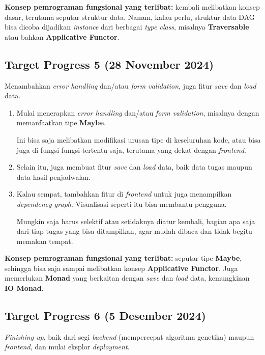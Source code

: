 \documentclass{article}
\begin{document}
\textbf{Konsep pemrograman fungsional yang terlibat:} kembali melibatkan konsep dasar, terutama seputar struktur data. Namun, kalau perlu, struktur data DAG bisa dicoba dijadikan \textit{instance} dari berbagai \textit{type class}, misalnya \textbf{Traversable} atau bahkan \textbf{Applicative Functor}.

\subsection*{Target Progress 5 (28 November 2024)}

Menambahkan \textit{error handling} dan/atau \textit{form validation}, juga fitur \textit{save} dan \textit{load} data.

\begin{enumerate}
    \item Mulai menerapkan \textit{error handling} dan/atau \textit{form validation}, misalnya dengan memanfaatkan tipe \textbf{Maybe}.
    
    Ini bisa saja melibatkan modifikasi urusan tipe di keseluruhan kode, atau bisa juga di fungsi-fungsi tertentu saja, terutama yang dekat dengan \textit{frontend}.

    \item Selain itu, juga membuat fitur \textit{save} dan \textit{load} data, baik data tugas maupun data hasil penjadwalan.
    
    \item Kalau sempat, tambahkan fitur di \textit{frontend} untuk juga menampilkan \textit{dependency graph}. Visualisasi seperti itu bisa membantu pengguna.
        
    Mungkin saja harus selektif atau setidaknya diatur kembali, bagian apa saja dari tiap tugas yang bisa ditampilkan, agar mudah dibaca dan tidak begitu memakan tempat.
\end{enumerate}

\textbf{Konsep pemrograman fungsional yang terlibat:} seputar tipe \textbf{Maybe}, sehingga bisa saja sampai melibatkan konsep \textbf{Applicative Functor}. Juga memerlukan \textbf{Monad} yang berkaitan dengan \textit{save} dan \textit{load} data, kemungkinan \textbf{IO Monad}.

\subsection*{Target Progress 6 (5 Desember 2024)}

\textit{Finishing up}, baik dari segi \textit{backend} (mempercepat algoritma genetika) maupun \textit{frontend}, dan mulai eksplor \textit{deployment}.
\end{document}

